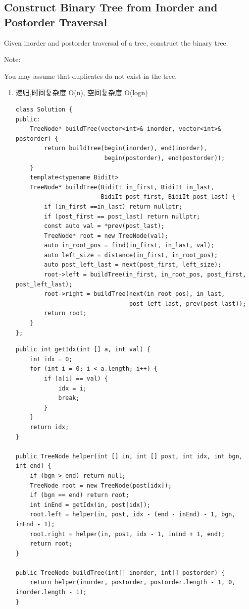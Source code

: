 \documentclass[12pt]{book}
\begin{document}
\subsection{Construct Binary Tree from Inorder and Postorder Traversal}
\label{sec-4-3-2}
Given inorder and postorder traversal of a tree, construct the binary tree.

Note:

You may assume that duplicates do not exist in the tree.

\begin{enumerate}
\item 递归,时间复杂度 O(n), 空间复杂度 O(logn)
\label{sec-4-3-2-1}

\lstset{language=java,label= ,caption= ,numbers=none}
\begin{lstlisting}
class Solution {
public:
    TreeNode* buildTree(vector<int>& inorder, vector<int>& postorder) {
        return buildTree(begin(inorder), end(inorder),
                         begin(postorder), end(postorder));
    }
    template<typename BidiIt>
    TreeNode* buildTree(BidiIt in_first, BidiIt in_last,
                        BidiIt post_first, BidiIt post_last) {
        if (in_first ==in_last) return nullptr;
        if (post_first == post_last) return nullptr;
        const auto val = *prev(post_last);
        TreeNode* root = new TreeNode(val);
        auto in_root_pos = find(in_first, in_last, val);
        auto left_size = distance(in_first, in_root_pos);
        auto post_left_last = next(post_first, left_size);
        root->left = buildTree(in_first, in_root_pos, post_first, post_left_last);
        root->right = buildTree(next(in_root_pos), in_last,
                                post_left_last, prev(post_last));
        return root;
    }
};
\end{lstlisting}

\lstset{language=java,label= ,caption= ,numbers=none}
\begin{lstlisting}
public int getIdx(int [] a, int val) {
    int idx = 0;
    for (int i = 0; i < a.length; i++) {
        if (a[i] == val) {
            idx = i;
            break;
        }
    }
    return idx;
}

public TreeNode helper(int [] in, int [] post, int idx, int bgn, int end) {
    if (bgn > end) return null;
    TreeNode root = new TreeNode(post[idx]);
    if (bgn == end) return root;
    int inEnd = getIdx(in, post[idx]);
    root.left = helper(in, post, idx - (end - inEnd) - 1, bgn, inEnd - 1);
    root.right = helper(in, post, idx - 1, inEnd + 1, end);
    return root;
}

public TreeNode buildTree(int[] inorder, int[] postorder) {
    return helper(inorder, postorder, postorder.length - 1, 0, inorder.length - 1);
}
\end{lstlisting}
\end{enumerate}
\end{document}
